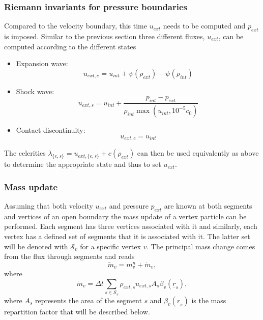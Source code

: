 \documentclass[12pt]{memoir}
\newcommand{\uvec}[1]{\underline{#1}}
\begin{document}
\subsubsection{Riemann invariants for pressure boundaries}
\label{h:open:pres}
Compared to the velocity boundary, this time $u_{ext}$ needs to be
computed and $p_{ext}$ is imposed. Similar to the previous section three
different fluxes, $u_{ext}$, can be computed according to the different
states
\begin{itemize}
\item Expansion wave:
\begin{equation}
u_{ext,e} = u_{int} + \psi(\rho_{ext}) - \psi(\rho_{int})
\label{e:open:pexp}
\end{equation}
\item Shock wave:
\begin{equation}
u_{ext,s} = u_{int} + \frac{p_{int} - p_{ext}}{\rho_{int}\max(u_{int},
10^{-5}c_0)}
\label{e:open:pshock}
\end{equation}
\item Contact discontinuity:
\begin{equation}
u_{ext,c} = u_{int}
\label{e:open:pcontact}
\end{equation}
\end{itemize}
The celerities $\lambda_{\{e,s\}} = u_{ext,\{e,s\}} + c(\rho_{ext})$ can
then be used equivalently as above to determine the appropriate state
and thus to set $u_{ext}$.

\subsubsection{Mass update}
Assuming that both velocity $u_{ext}$ and pressure $p_{ext}$ are known
at both segments and vertices of an open boundary the mass update of a
vertex particle can be performed. Each segment has three vertices
associated with it and similarly, each vertex has a defined set of
segments that it is associated with it. The latter set will be denoted
with $\mathcal{S}_v$ for a specific vertex $v$. The principal mass
change comes from the flux through segments and reads
\begin{equation}
\widetilde{m}_v = m^n_v + \dot{m}_v,
\label{e:open:mtilde}
\end{equation}
where
\begin{equation}
\dot{m}_v = \Delta t \underset{s \in \mathcal{S}_v}{\sum}
\rho_{ext,s} u_{ext,s} A_s \beta_v(\uvec{r}_s),
\label{e:open:mdot}
\end{equation}
where $A_s$ represents the area of the segment $s$ and
$\beta_v(\uvec{r}_s)$ is the mass repartition factor that will be
described below.
\end{document}
